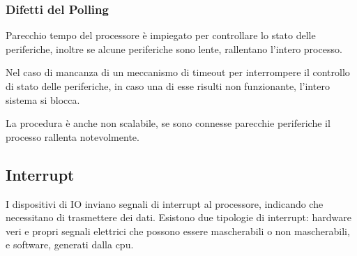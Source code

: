 \documentclass[../template]{subfiles}
\begin{document}
\subsubsection{Difetti del Polling}
Parecchio tempo del processore è impiegato per controllare lo stato delle periferiche, inoltre se alcune periferiche sono lente, rallentano l'intero processo.

Nel caso di mancanza di un meccanismo di timeout per interrompere il controllo di stato delle periferiche, in caso una di esse risulti non funzionante, l'intero sistema si blocca.

La procedura è anche non scalabile, se sono connesse parecchie periferiche il processo rallenta notevolmente.

\subsection{Interrupt}
I dispositivi di IO inviano segnali di interrupt al processore, indicando che necessitano di trasmettere dei dati.
Esistono due tipologie di interrupt: hardware veri e propri segnali elettrici che possono essere mascherabili o non mascherabili, e software, generati dalla cpu.
\end{document}

